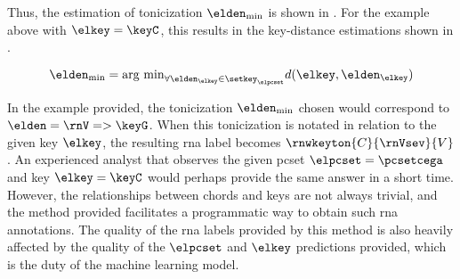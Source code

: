
Thus, the estimation of tonicization $\elden_{\min}$ is
shown in . For the example
above with $\elkey = \keyC$, this results in the
key-distance estimations shown in
.

\begin{equation}
    \label{eq:tonicization_estimation}
    \elden_{\min} = \text{arg min}_{\forall \elden_\elkey \in \setkey_\elpcset} d(\elkey, \elden_\elkey)
\end{equation}


In the example provided, the tonicization $\elden_{\min}$
chosen would correspond to $\elden = \rnV => \keyG$. When this
tonicization is notated in relation to the given key
$\elkey$, the resulting \gls{rna} label becomes
$\rnwkeyton{C}{\rnVsev}{V}$. An experienced analyst that
observes the given \gls{pcset} $\elpcset = \pcsetcega$ and
key $\elkey = \keyC$ would perhaps provide the same answer
in a short time. 
However, the relationships between chords and keys are not
always trivial, and the method provided facilitates a
programmatic way to obtain such \gls{rna} annotations. The
quality of the \gls{rna} labels provided by this method is
also heavily affected by the quality of the $\elpcset$ and
$\elkey$ predictions provided, which is the duty of the
machine learning model.

